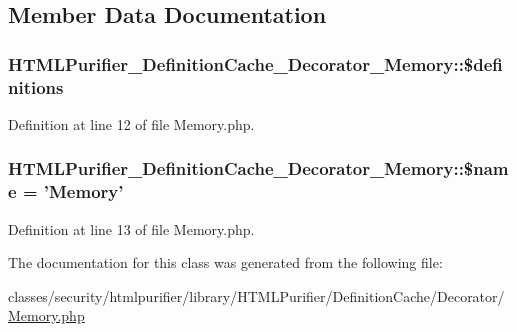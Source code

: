 \subsection{Member Data Documentation}
\hypertarget{classHTMLPurifier__DefinitionCache__Decorator__Memory_aaaebf9d79d50657b768a0aea22516474}{
\subsubsection[{\$definitions}]{\setlength{\rightskip}{0pt plus 5cm}H\+T\+M\+L\+Purifier\+\_\+\+Definition\+Cache\+\_\+\+Decorator\+\_\+\+Memory\+::\$definitions\hspace{0.3cm}{\ttfamily [protected]}}}\label{classHTMLPurifier__DefinitionCache__Decorator__Memory_aaaebf9d79d50657b768a0aea22516474}


Definition at line 12 of file Memory.\+php.

\hypertarget{classHTMLPurifier__DefinitionCache__Decorator__Memory_aaa583537f97f1890c13803cdbc97474f}{
\subsubsection[{\$name}]{\setlength{\rightskip}{0pt plus 5cm}H\+T\+M\+L\+Purifier\+\_\+\+Definition\+Cache\+\_\+\+Decorator\+\_\+\+Memory\+::\$name = 'Memory'}}\label{classHTMLPurifier__DefinitionCache__Decorator__Memory_aaa583537f97f1890c13803cdbc97474f}


Definition at line 13 of file Memory.\+php.



The documentation for this class was generated from the following file\+:\begin{DoxyCompactItemize}
\item 
classes/security/htmlpurifier/library/\+H\+T\+M\+L\+Purifier/\+Definition\+Cache/\+Decorator/\hyperlink{Memory_8php}{Memory.\+php}\end{DoxyCompactItemize}
